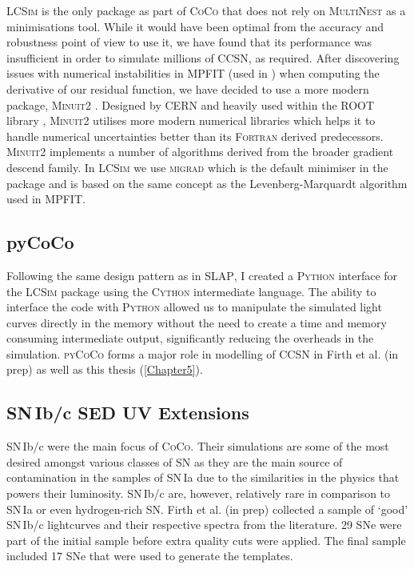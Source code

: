 \textsc{LCSim} is the only package as part of \textsc{CoCo} that does not rely on \textsc{MultiNest} as a minimisations tool. While it would have been optimal from the accuracy and robustness point of view to use it, we have found that its performance was insufficient in order to simulate millions of CCSN, as required. After discovering issues with numerical instabilities in \textsc{MPFIT} (used in ) when computing the derivative of our residual function, we have decided to use a more modern package, \textsc{Minuit2} \citep{James1975}. Designed by CERN and heavily used within the ROOT library \citep{Brun1997}, \textsc{Minuit2} utilises more modern numerical libraries which helps it to handle numerical uncertainties better than its \textsc{Fortran} derived predecessors. \textsc{Minuit2} implements a number of algorithms derived from the broader gradient descend family. In \textsc{LCSim} we use \textsc{migrad} which is the default minimiser in the package and is based on the same concept as the Levenberg-Marquardt algorithm used in \textsc{MPFIT}.

\subsection{pyCoCo}
Following the same design pattern as in \textsc{SLAP}, I created a \textsc{Python} interface for the \textsc{LCSim} package using the \textsc{Cython} intermediate language. The ability to interface the code with \textsc{Python} allowed us to manipulate the simulated light curves directly in the memory without the need to create a time and memory consuming intermediate output, significantly reducing the overheads in the simulation. \textsc{pyCoCo} forms a major role in modelling of CCSN in Firth et al. (in prep) as well as this thesis (\cref{Chapter5}).

\subsection{SN\,Ib/c SED UV Extensions}
SN\,Ib/c were the main focus of \textsc{CoCo}. Their simulations are some of the most desired amongst various classes of SN as they are the main source of contamination in the samples of SN\,Ia due to the similarities in the physics that powers their luminosity. SN\,Ib/c are, however, relatively rare in comparison to SN\,Ia or even hydrogen-rich SN.   Firth et al. (in prep) collected a sample of `good' SN\,Ib/c lightcurves and their respective spectra from the literature. 29 SNe were part of the initial sample before extra quality cuts were applied. The final sample included 17 SNe that were used to generate the templates.

